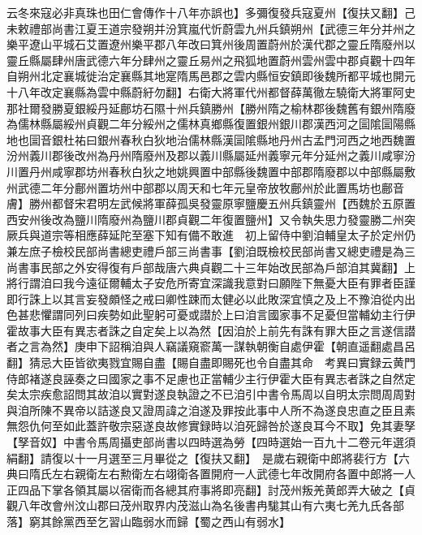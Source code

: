 云冬來寇必非真珠也田仁會傳作十八年亦誤也】多彌復發兵寇夏州【復扶又翻】己未敕禮部尚書江夏王道宗發朔并汾箕嵐代忻蔚雲九州兵鎮朔州【武德三年分并州之樂平遼山平城石艾置遼州樂平郡八年改曰箕州後周置蔚州於漢代郡之靈丘隋廢州以靈丘縣屬肆州唐武德六年分肆州之靈丘易州之飛狐地置蔚州雲州雲中郡貞觀十四年自朔州北定襄城徙治定襄縣其地寔隋馬邑郡之雲内縣恒安鎮即後魏所都平城也開元十八年改定襄縣為雲中縣蔚紆勿翻】右衛大將軍代州都督薛萬徹左驍衛大將軍阿史那社爾發勝夏銀綏丹延鄜坊石隰十州兵鎮勝州【勝州隋之榆林郡後魏舊有銀州隋廢為儒林縣屬綏州貞觀二年分綏州之儒林真鄉縣復置銀州銀川郡漢西河之圁隂圁陽縣地也圁音銀杜祐曰銀州春秋白狄地治儒林縣漢圁隂縣地丹州古孟門河西之地西魏置汾州義川郡後改州為丹州隋廢州及郡以義川縣屬延州義寧元年分延州之義川咸寧汾川置丹州咸寧郡坊州春秋白狄之地姚興置中部縣後魏置中部郡隋廢郡以中部縣屬敷州武德二年分鄜州置坊州中部郡以周天和七年元皇帝放牧鄜州於此置馬坊也鄜音膚】勝州都督宋君明左武候將軍薛孤吳發靈原寧鹽慶五州兵鎮靈州【西魏於五原置西安州後改為鹽川隋廢州為鹽川郡貞觀二年復置鹽州】又令執失思力發靈勝二州突厥兵與道宗等相應薛延陀至塞下知有備不敢進　初上留侍中劉洎輔皇太子於定州仍兼左庶子檢校民部尚書總吏禮戶部三尚書事【劉洎既檢校民部尚書又總吏禮是為三尚書事民部之外安得復有戶部哉唐六典貞觀二十三年始改民部為戶部洎其冀翻】上將行謂洎曰我今遠征爾輔太子安危所寄宜深識我意對曰願陛下無憂大臣有罪者臣謹即行誅上以其言妄發頗怪之戒曰卿性踈而太健必以此敗深宜慎之及上不豫洎從内出色甚悲懼謂同列曰疾勢如此聖躬可憂或譛於上曰洎言國家事不足憂但當輔幼主行伊霍故事大臣有異志者誅之自定矣上以為然【因洎於上前先有誅有罪大臣之言遂信譛者之言為然】庚申下詔稱洎與人竊議窺窬萬一謀執朝衡自處伊霍【朝直遥翻處昌呂翻】猜忌大臣皆欲夷戮宜賜自盡【賜自盡即賜死也令自盡其命　考異曰實録云黄門侍郎褚遂良誣奏之曰國家之事不足慮也正當輔少主行伊霍大臣有異志者誅之自然定矣太宗疾愈詔問其故洎以實對遂良執證之不已洎引中書令馬周以自明太宗問周周對與洎所陳不異帝以詰遂良又證周諱之洎遂及罪按此事中人所不為遂良忠直之臣且素無怨仇何至如此蓋許敬宗惡遂良故修實録時以洎死歸咎於遂良耳今不取】免其妻孥【孥音奴】中書令馬周攝吏部尚書以四時選為勞【四時選始一百九十二卷元年選須絹翻】請復以十一月選至三月畢從之【復扶又翻】　是歲右親衛中郎將裴行方【六典曰隋氏左右親衛左右勲衛左右翊衛各置開府一人武德七年改開府各置中郎將一人正四品下掌各領其屬以宿衛而各總其府事將即亮翻】討茂州叛羌黄郎弄大破之【貞觀八年改會州汶山郡曰茂州取界内茂滋山為名後書冉駹其山有六夷七羌九氏各部落】窮其餘黨西至乞習山臨弱水而歸【蜀之西山有弱水】

